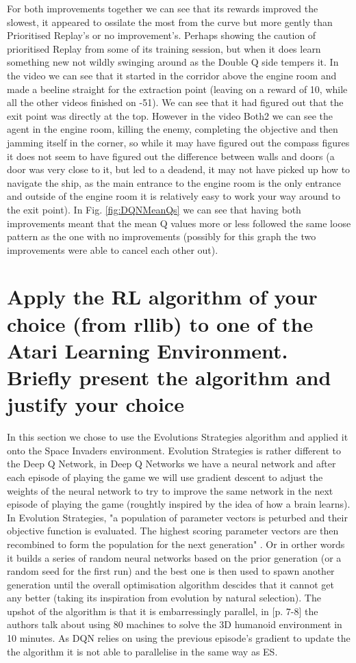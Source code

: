 \documentclass[a4pape, 11pt, english]{article}
\begin{document}
For both improvements together we can see that its rewards improved the slowest, it appeared to ossilate the most from the curve but more gently than Prioritised Replay's or no improvement's. Perhaps showing the caution of prioritised Replay from some of its training session, but when it does learn something new not wildly swinging around as the Double Q side tempers it. In the video we can see that it started in the corridor above the engine room and made a beeline straight for the extraction point (leaving on a reward of 10, while all the other videos finished on -51). We can see that it had figured out that the exit point was directly at the top. However in the video Both2 we can see the agent in the engine room, killing the enemy, completing the objective and then jamming itself in the corner, so while it may have figured out the compass figures it does not seem to have figured out the difference between walls and doors (a door was very close to it, but led to a deadend, it may not have picked up how to navigate the ship, as the main entrance to the engine room is the only entrance and outside of the engine room it is relatively easy to work your way around to the exit point). In Fig. \ref{fig:DQNMeanQs} we can see that having both improvements meant that the mean Q values more or less followed the same loose pattern as the one with no improvements (possibly for this graph the two improvements were able to cancel each other out).

\section{Apply the RL algorithm of your choice (from rllib) to one of the Atari Learning Environment. Briefly present the algorithm and justify your choice}
In this section we chose to use the Evolutions Strategies algorithm and applied it onto the Space Invaders environment. Evolution Strategies is rather different to the Deep Q Network, in Deep Q Networks we have a neural network and after each episode of playing the game we will use gradient descent to adjust the weights of the neural network to try to improve the same network in the next episode of playing the game (roughtly inspired by the idea of how a brain learns). In Evolution Strategies, "a population of parameter vectors is peturbed and their objective function is evaluated. The highest scoring parameter vectors are then recombined to form the population for the next generation" \citep{salimans_evolution_2017}. Or in orther words it builds a series of random neural networks based on the prior generation (or a random seed for the first run) and the best one is then used to spawn another generation until the overall optimisation algorithm descides that it cannot get any better (taking its inspiration from evolution by natural selection).
The upshot of the algorithm is that it is embarressingly parallel, in  \citep{salimans_evolution_2017}[p. 7-8] the authors talk about using 80 machines to solve the 3D humanoid environment in 10 minutes. As DQN relies on using the previous episode's gradient to update the the algorithm it is not able to parallelise in the same way as ES.
\end{document}
